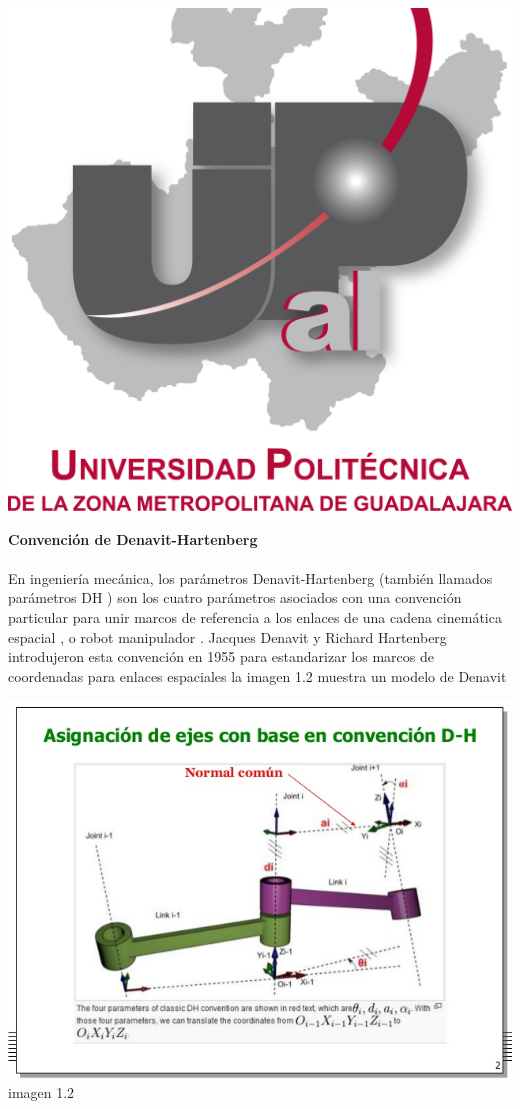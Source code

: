 \documentclass[10pt,a4paper]{article}
\begin{document}
\begin{center}
\includegraphics[scale=0.2]{imagenes/upzmg.png} 
\end{center}
\textbf{\huge Convención de Denavit-Hartenberg}\\ \\
\large \huge En ingeniería mecánica, los parámetros Denavit-Hartenberg (también llamados parámetros DH ) son los cuatro parámetros asociados con una convención particular para unir marcos de referencia a los enlaces de una cadena cinemática espacial , o robot manipulador .
Jacques Denavit y Richard Hartenberg introdujeron esta convención en 1955 para estandarizar los marcos de coordenadas para enlaces espaciales la imagen 1.2 muestra un modelo de Denavit
\begin{center}\includegraphics[scale=0.6]{imagenes/grafica.jpg} imagen 1.2 
\begin{center}
\end{center}
\end{center}
\end{document}
